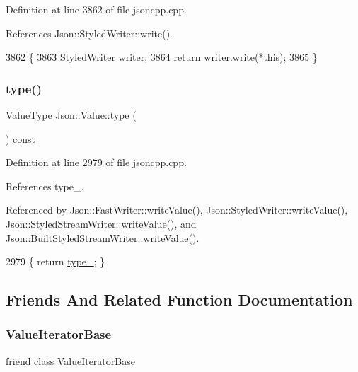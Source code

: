 Definition at line 3862 of file jsoncpp.\+cpp.



References Json\+::\+Styled\+Writer\+::write().


\begin{DoxyCode}
3862                                            \{
3863   StyledWriter writer;
3864   \textcolor{keywordflow}{return} writer.write(*\textcolor{keyword}{this});
3865 \}
\end{DoxyCode}
\mbox{\label{class_json_1_1_value_a8ce61157a011894f0252ceed232312de}} 
\subsubsection{\texorpdfstring{type()}{type()}}
{\footnotesize\ttfamily \hyperlink{namespace_json_a7d654b75c16a57007925868e38212b4e}{Value\+Type} Json\+::\+Value\+::type (\begin{DoxyParamCaption}{ }\end{DoxyParamCaption}) const}



Definition at line 2979 of file jsoncpp.\+cpp.



References type\+\_\+.



Referenced by Json\+::\+Fast\+Writer\+::write\+Value(), Json\+::\+Styled\+Writer\+::write\+Value(), Json\+::\+Styled\+Stream\+Writer\+::write\+Value(), and Json\+::\+Built\+Styled\+Stream\+Writer\+::write\+Value().


\begin{DoxyCode}
2979 \{ \textcolor{keywordflow}{return} \hyperlink{class_json_1_1_value_abd222c2536dc88bf330dedcd076d2356}{type\_}; \}
\end{DoxyCode}


\subsection{Friends And Related Function Documentation}
\mbox{\label{class_json_1_1_value_ad016df56489e5d360735457afba2f649}} 
\subsubsection{\texorpdfstring{Value\+Iterator\+Base}{ValueIteratorBase}}
{\footnotesize\ttfamily friend class \hyperlink{class_json_1_1_value_iterator_base}{Value\+Iterator\+Base}\hspace{0.3cm}{\ttfamily [friend]}}



